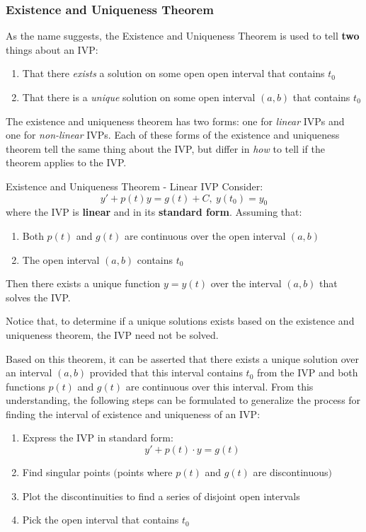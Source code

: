 \documentclass[12pt]{article}
\begin{document}
\subsubsection{Existence and Uniqueness Theorem}
\label{sssec:existenceAndUniquenessTheorem}

As the name suggests, the Existence and Uniqueness Theorem is used to tell \textbf{two} things about an IVP:
\begin{enumerate}
  \itemsep0em
  \item That there \textit{exists} a solution on some open open interval that contains $t_0$
  \item That there is a \textit{unique} solution on some open interval $(a,b)$ that contains $t_0$
\end{enumerate}

The existence and uniqueness theorem has two forms: one for \textit{linear} IVPs and one for \textit{non-linear} IVPs. Each of these forms of the existence and uniqueness theorem tell the same thing about the IVP, but differ in \textit{how} to tell if the theorem applies to the IVP.

\begin{definition}{Existence and Uniqueness Theorem - Linear IVP}
  Consider:
  \begin{equation*}
    y' + p(t)y = g(t) + C,\ y(t_0) = y_0
  \end{equation*}
  where the IVP is \textbf{linear} and in its \textbf{standard form}.
  Assuming that:
  \begin{enumerate}
    \itemsep0em
    \item Both $p(t)$ and $g(t)$ are continuous over the open interval $(a,b)$
    \item The open interval $(a,b)$ contains $t_0$
  \end{enumerate}
  Then there exists a unique function $y = y(t)$ over the interval $(a,b)$ that solves the IVP.
\end{definition}

Notice that, to determine if a unique solutions exists based on the existence and uniqueness theorem, the IVP need not be solved.

Based on this theorem, it can be asserted that there exists a unique solution over an interval $(a,b)$ provided that this interval contains $t_0$ from the IVP and both functions $p(t)$ and $g(t)$ are continuous over this interval. From this understanding, the following steps can be formulated to generalize the process for finding the interval of existence and uniqueness of an IVP:
\begin{enumerate}
  \itemsep0em
  \item Express the IVP in standard form:
    \begin{equation*}
      y' + p(t) \cdot y = g(t)
    \end{equation*}
  \item Find singular points $\big($points where $p(t)$ and $g(t)$ are discontinuous$\big)$
  \item Plot the discontinuities to find a series of disjoint open intervals
  \item Pick the open interval that contains $t_0$
\end{enumerate}
\end{document}
